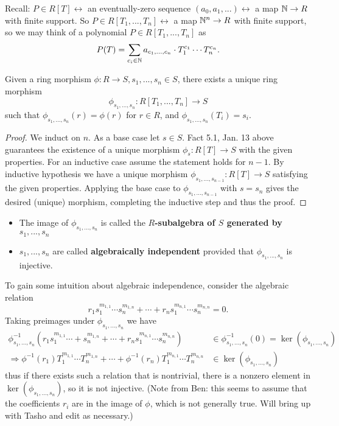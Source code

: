 Recall: $P \in R[T] \leftrightarrow$ an eventually-zero sequence $(a_0, a_1, ...) \leftrightarrow$ a map $\mathbb{N} \rightarrow R$ with finite support. So $P \in R[T_1, ..., T_n] \leftrightarrow$ a map $\mathbb{N}^n \rightarrow R$ with finite support, so we may think of a polynomial $P \in R[T_1, ..., T_n]$ as
\[P(T) = \sum_{c_i \in \mathbb{N}} a_{c_1, ..., c_n} \cdot T_1^{c_1} \cdots T_n^{c_n}.\]

\begin{fact}
Given a ring morphism $\phi \colon R \rightarrow S, s_1, ..., s_n \in S$, there exists a unique ring morphism \[\phi_{s_1, ..., s_n} \colon R[T_1, ..., T_n] \rightarrow S\] such that $\phi_{s_1, ..., s_n}(r) = \phi(r)$ for $r \in R$, and $\phi_{s_1, ..., s_n}(T_i) = s_i$.
\end{fact}
\begin{proof}
We induct on $n$. As a base case let $s \in S$. Fact 5.1, Jan. 13 above guarantees the existence of a unique morphism $\phi_s \colon R[T] \rightarrow S$ with the given properties. For an inductive case assume the statement holds for $n - 1$. By inductive hypothesis we have a unique morphism $\phi_{s_1, ..., s_{n-1}} \colon R[T] \rightarrow S$ satisfying the given properties. Applying the base case to $\phi_{s_1, ..., s_{n-1}}$ with $s = s_n$ gives the desired (unique) morphism, completing the inductive step and thus the proof.
\end{proof}

\begin{defn} \hspace{0.5cm}
\begin{itemize}
\item The image of $\phi_{s_1, ..., s_n}$ is called the \textbf{$R$-subalgebra of $S$ generated by $s_1, ..., s_n$}
\item $s_1, ..., s_n$ are called \textbf{algebraically independent} provided that $\phi_{s_1, ..., s_n}$ is injective.
\end{itemize}
\end{defn}

To gain some intuition about algebraic independence, consider the algebraic relation
\[r_1s_1^{m_{1,1}} \cdots s_n^{m_{1, n}} + \cdots + r_ns_1^{m_{n, 1}} \cdots s_n^{m_{n, n}} = 0.\]
Taking preimages under $\phi_{s_1, ..., s_n}$ we have
\begin{align*}
\phi_{s_1, ..., s_n}^{-1}(r_1s_1^{m_{1,1}} \cdots + s_n^{m_{1, n}} + \cdots + r_ns_1^{m_{n, 1}} \cdots s_n^{m_{n, n}}) &\in \phi_{s_1, ..., s_n}^{-1}(0) = \ker(\phi_{s_1, ..., s_n}) \\
\Rightarrow \phi^{-1}(r_1)T_1^{m_{1,1}} \cdots T_n^{m_{1,n}} + \cdots + \phi^{-1}(r_n)T_1^{m_{n,1}} \cdots T_n^{m_{n,n}} &\in \ker(\phi_{s_1, ..., s_n})
\end{align*}
thus if there exists such a relation that is nontrivial, there is a nonzero element in $\ker(\phi_{s_1, ..., s_n})$, so it is not injective. (Note from Ben: this seems to assume that the coefficients $r_i$ are in the image of $\phi$, which is not generally true. Will bring up with Tasho and edit as necessary.)

